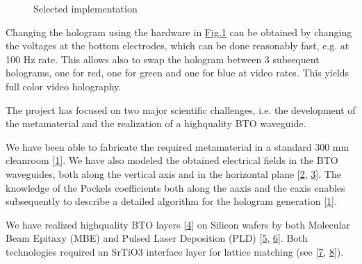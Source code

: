 \documentclass[a4paper,10pt,english,openany,oneside]{jupyterBook}
\begin{document}
\begin{figure}[htbp]
\centering
\capstart

\noindent{}
\caption{Selected implementation}\label{\detokenize{intro2:selectedimplementation}}\end{figure}

\sphinxAtStartPar
Changing the hologram using the hardware in \hyperref[\detokenize{intro2:selectedimplementation}]{Fig.\@ \ref{\detokenize{intro2:selectedimplementation}}} can be obtained by changing the voltages at the bottom electrodes, which can be done reasonably fast, e.g. at 100 Hz rate. This allows also to swap the hologram between 3 subsequent holograms, one for red, one for green and one for blue at video rates. This yields full color video holography.

\begin{DUlineblock}{0em}
\item[] 
\end{DUlineblock}

\sphinxAtStartPar
The project has focused on two major scientific challenges, i.e. the development of the metamaterial and the realization of a high\sphinxhyphen{}quality BTO waveguide.

\begin{DUlineblock}{0em}
\item[] 
\end{DUlineblock}

\sphinxAtStartPar
We have been able to fabricate the required metamaterial in a standard 300 mm cleanroom {[}\hyperlink{cite.bib:id9}{1}{]}. We have also modeled the obtained electrical fields in the BTO waveguides, both along the vertical axis and in the horizontal plane {[}\hyperlink{cite.bib:id8}{2}, \hyperlink{cite.bib:id6}{3}{]}. The knowledge of the Pockels coefficients both along the a\sphinxhyphen{}axis and the c\sphinxhyphen{}axis enables subsequently to describe a detailed algorithm for the hologram generation {[}\hyperlink{cite.bib:id9}{1}{]}.

\begin{DUlineblock}{0em}
\item[] 
\end{DUlineblock}

\sphinxAtStartPar
We have realized high\sphinxhyphen{}quality BTO layers {[}\hyperlink{cite.bib:id10}{4}{]} on Silicon wafers by both Molecular Beam Epitaxy (MBE) and Pulsed Laser Deposition (PLD) {[}\hyperlink{cite.bib:id13}{5}, \hyperlink{cite.bib:id14}{6}{]}. Both technologies required an SrTiO3 interface layer for lattice matching (see {[}\hyperlink{cite.bib:id12}{7}, \hyperlink{cite.bib:id11}{8}{]}).
\end{document}
